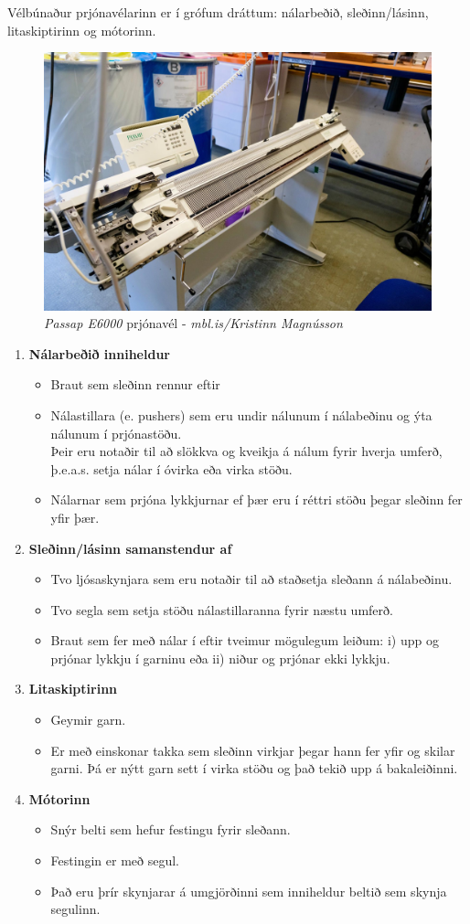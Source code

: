 Vélbúnaður prjónavélarinn er í grófum dráttum:  nálarbeðið, sleðinn/lásinn, litaskiptirinn og mótorinn.

\begin{figure}[H]
    \centering
    \includegraphics[width=0.5\linewidth]{myndir/elli/e6000.jpg}
    \caption{\textit{Passap E6000} prjónavél - \textit{mbl.is/Kristinn Magnússon}}
    \label{fig:e6000}
\end{figure}
\begin{enumerate}
    \item \textbf{Nálarbeðið inniheldur}
\begin{itemize}
    \item Braut sem sleðinn rennur eftir
    \item Nálastillara (e. pushers) sem eru undir nálunum í nálabeðinu og ýta nálunum í prjónastöðu. \\
    Þeir eru notaðir til að slökkva og kveikja á nálum fyrir hverja umferð, þ.e.a.s. setja nálar í óvirka eða virka stöðu.
    \item Nálarnar sem prjóna lykkjurnar ef þær eru í réttri stöðu þegar sleðinn fer yfir þær.
\end{itemize}
    \item \textbf{Sleðinn/lásinn samanstendur af}
    \begin{itemize}
        \item Tvo ljósaskynjara sem eru notaðir til að staðsetja sleðann á nálabeðinu.
        \item Tvo segla sem setja stöðu nálastillaranna fyrir næstu umferð.
        \item Braut sem fer með nálar í eftir tveimur mögulegum leiðum: 
        i) upp og prjónar lykkju í garninu eða ii) niður og prjónar ekki lykkju.
    \end{itemize}
    \item \textbf{Litaskiptirinn}
    \begin{itemize}
        \item Geymir garn.
        \item Er með einskonar takka sem sleðinn virkjar þegar hann fer yfir og skilar garni. Þá er nýtt garn sett í virka stöðu og það tekið upp á bakaleiðinni.
    \end{itemize}
    \item \textbf{Mótorinn} 
    \begin{itemize}
        \item Snýr belti sem hefur festingu fyrir sleðann.
        \item Festingin er með segul.
        \item Það eru þrír skynjarar á umgjörðinni sem inniheldur beltið sem skynja segulinn.
    \end{itemize}
\end{enumerate}
